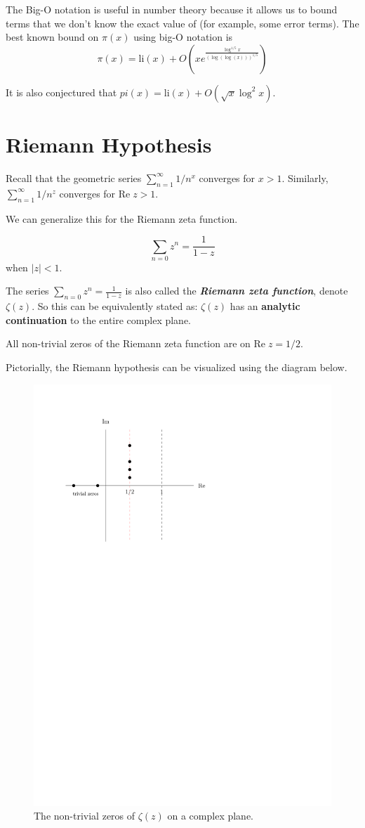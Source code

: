 The Big-O notation is useful in number theory because it allows us to bound terms that we don't know the exact value of (for example, some error terms). The best known bound on $\pi(x)$ using big-O notation is
$$
\pi(x) = \mathrm{li}(x) + O\left( xe^{\frac{\log^{1/5}x}{(\log(\log(x)))^{1/5}}} \right) 
$$

It is also conjectured that $pi(x) = \mathrm{li}(x) + O(\sqrt{x} \log^2 x)$.

\section{Riemann Hypothesis}
Recall that the geometric series $\sum_{n=1}^\infty 1/n^x$ converges for $x > 1$. Similarly, $\sum_{n=1}^\infty 1/n^z$ converges for $\mathrm{Re}\; z > 1$.

We can generalize this for the Riemann zeta function.

\begin{theorem}
    $$
    \sum_{n=0}z^n = \frac{1}{1-z}
    $$
    when $|z| < 1$.

    The series $\sum_{n=0}z^n = \frac{1}{1-z}$ is also called the \textit{\textbf{Riemann zeta function}}, denote $\zeta(z)$. So this can be equivalently stated as: $\zeta(z)$ has an \textbf{analytic continuation} to the entire complex plane.
\end{theorem}
\begin{conjecture}
    All non-trivial zeros of the Riemann zeta function are on $\mathrm{Re}\; z = 1/2$.
\end{conjecture}

Pictorially, the Riemann hypothesis can be visualized using the diagram below.

\begin{figure}[htbp]
    \centering
    \includegraphics[width=.5\linewidth]{figures/riemann-hypothesis.pdf} 
    \caption{The non-trivial zeros of $\zeta(z)$ on a complex plane.}
    \label{fig:riemann-hypothesis}
\end{figure}

